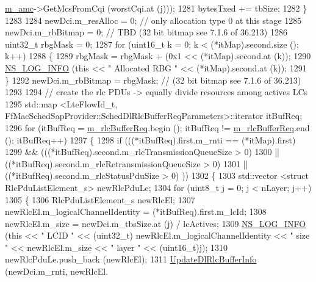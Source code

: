 \begin{DoxyCode}
      \hyperlink{classns3_1_1PfFfMacScheduler_a8ed3fd6ae921b6161a10c2c9b0e869a4}{m\_amc}->GetMcsFromCqi (worstCqi.at (j)));
1281           bytesTxed += tbSize;
1282         \}
1283 
1284       newDci.m\_resAlloc = 0;  \textcolor{comment}{// only allocation type 0 at this stage}
1285       newDci.m\_rbBitmap = 0; \textcolor{comment}{// TBD (32 bit bitmap see 7.1.6 of 36.213)}
1286       uint32\_t rbgMask = 0;
1287       \textcolor{keywordflow}{for} (uint16\_t k = 0; k < (*itMap).second.size (); k++)
1288         \{
1289           rbgMask = rbgMask + (0x1 << (*itMap).second.at (k));
1290           \hyperlink{group__logging_gafbd73ee2cf9f26b319f49086d8e860fb}{NS\_LOG\_INFO} (\textcolor{keyword}{this} << \textcolor{stringliteral}{" Allocated RBG "} << (*itMap).second.at (k));
1291         \}
1292       newDci.m\_rbBitmap = rbgMask; \textcolor{comment}{// (32 bit bitmap see 7.1.6 of 36.213)}
1293 
1294       \textcolor{comment}{// create the rlc PDUs -> equally divide resources among actives LCs}
1295       std::map <LteFlowId\_t, FfMacSchedSapProvider::SchedDlRlcBufferReqParameters>::iterator itBufReq;
1296       \textcolor{keywordflow}{for} (itBufReq = \hyperlink{classns3_1_1PfFfMacScheduler_aaad15dd674acb600fb8dc9263fcfa2bc}{m\_rlcBufferReq}.begin (); itBufReq != 
      \hyperlink{classns3_1_1PfFfMacScheduler_aaad15dd674acb600fb8dc9263fcfa2bc}{m\_rlcBufferReq}.end (); itBufReq++)
1297         \{
1298           \textcolor{keywordflow}{if} (((*itBufReq).first.m\_rnti == (*itMap).first)
1299               && (((*itBufReq).second.m\_rlcTransmissionQueueSize > 0)
1300                   || ((*itBufReq).second.m\_rlcRetransmissionQueueSize > 0)
1301                   || ((*itBufReq).second.m\_rlcStatusPduSize > 0) ))
1302             \{
1303               std::vector <struct RlcPduListElement\_s> newRlcPduLe;
1304               \textcolor{keywordflow}{for} (uint8\_t j = 0; j < nLayer; j++)
1305                 \{
1306                   RlcPduListElement\_s newRlcEl;
1307                   newRlcEl.m\_logicalChannelIdentity = (*itBufReq).first.m\_lcId;
1308                   newRlcEl.m\_size = newDci.m\_tbsSize.at (j) / lcActives;
1309                   \hyperlink{group__logging_gafbd73ee2cf9f26b319f49086d8e860fb}{NS\_LOG\_INFO} (\textcolor{keyword}{this} << \textcolor{stringliteral}{" LCID "} << (uint32\_t) newRlcEl.m\_logicalChannelIdentity 
      << \textcolor{stringliteral}{" size "} << newRlcEl.m\_size << \textcolor{stringliteral}{" layer "} << (uint16\_t)j);
1310                   newRlcPduLe.push\_back (newRlcEl);
1311                   \hyperlink{classns3_1_1PfFfMacScheduler_aca3332c10f1c59e1279001247ca7da79}{UpdateDlRlcBufferInfo} (newDci.m\_rnti, newRlcEl.

\end{DoxyCode}
